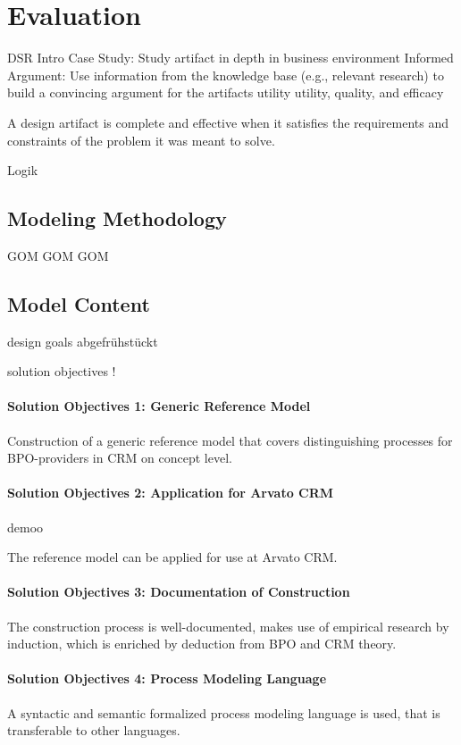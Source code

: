 
\chapter{Evaluation}
DSR Intro
Case Study: Study artifact in depth in business environment
Informed Argument: Use information from the knowledge base (e.g., relevant research) to build a convincing argument for the artifacts utility
utility, quality, and efficacy 

A design artifact is complete and effective when it satisfies the requirements and constraints of the problem it was meant to solve.

Logik
\section{Modeling Methodology}

GOM GOM GOM

\section{Model Content}

design goals abgefrühstückt

solution objectives !

\subsubsection{Solution Objectives 1: Generic Reference Model}


Construction of a generic reference model that covers distinguishing processes
for BPO-providers in CRM on concept level.

\subsubsection{Solution Objectives 2:  Application for Arvato CRM}

demoo

The reference model can be applied for use at Arvato CRM.

\subsubsection{Solution Objectives 3: Documentation of Construction}
The construction process is well-documented, makes use of empirical research by induction, which is enriched by deduction from BPO and CRM theory.

\subsubsection{Solution Objectives 4: Process Modeling Language }
A syntactic and semantic formalized process modeling language is used, that is transferable to other languages.

